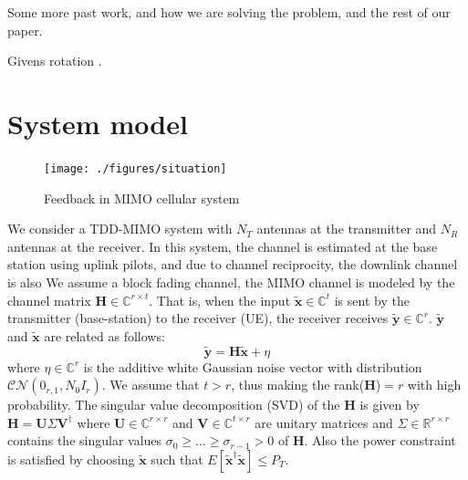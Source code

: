 \documentclass[conference]{IEEEtran}
\def\bH{\mathbf{H}}
\def\bU{\mathbf{U}}
\def\bV{\mathbf{V}}
\def\bx{\mathbf{x}}
\def\by{\mathbf{y}}
\begin{document}
Some more past work, and how we are solving the problem, and the rest
of our paper.

Givens rotation \cite{roh2004efficient}.


\section{System model}
\begin{figure}[htbp]
\centering
\texttt{[image: ./figures/situation]}
\caption{\label{fig:situation}Feedback in MIMO cellular system }
\end{figure}
We consider a TDD-MIMO system with $N_T$ antennas at the transmitter and
$N_R$ antennas at the receiver. In this system, the channel is
estimated at the base station using uplink pilots, and due to channel
reciprocity, the downlink channel is also
We assume a block fading channel, the
MIMO channel is modeled by the channel matrix
$\bH \in\mathbb{C}^{r \times t}$. That is, when the input
$\tilde{\bx} \in \mathbb{C}^{t}$ is sent by the transmitter
(base-station) to the receiver (UE), the
receiver receives $\tilde{\by} \in \mathbb{C}^r$. $\tilde{\by}$ and
$\tilde{\bx}$ are related as follows:
\begin{equation}
\tilde{\by} = \bH\tilde{\bx} + \eta
\end{equation}
where $\eta \in \mathbb{C}^{r}$ is the additive white Gaussian noise
vector with distribution $\mathcal{CN}(0_{r,1}, N_0I_{r})$. We assume
that $t > r$, thus making the rank($\bH$)$=r$ with high
probability. The singular value decomposition (SVD) of the $\bH$ is
given by $\bH=\bU \Sigma \bV^{\dagger}$ where
$\bU\in \mathbb{C}^{r\times r}$ and $\bV\in \mathbb{C}^{t\times r}$
are unitary matrices and $\Sigma\in \mathbb{R}^{r\times r}$ contains
the singular values $\sigma_{0}\geq\ldots\geq\sigma_{r-1}>0$ of
$\bH$. Also the power constraint is satisfied by choosing $\tilde{\bx}$
such that $E[\tilde{\bx}^{\dagger}\tilde{\bx}]\leq P_{{T}}$.
\end{document}
